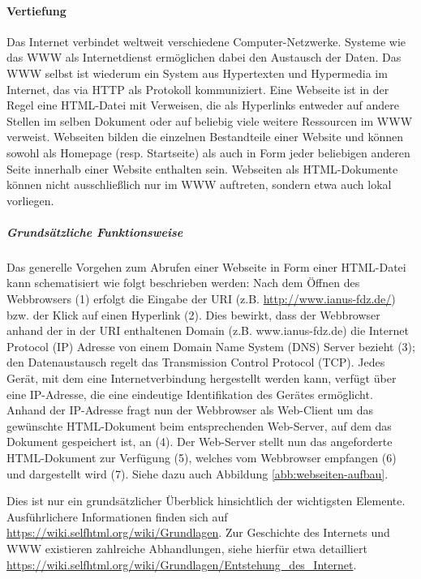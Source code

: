 \paragraph{Vertiefung} 
Das Internet verbindet weltweit verschiedene Computer-Netzwerke. Systeme wie das WWW als Internetdienst ermöglichen dabei den Austausch der Daten. Das WWW selbst ist wiederum ein System aus Hypertexten und Hypermedia im Internet, das via HTTP als Protokoll kommuniziert. Eine Webseite ist in der Regel eine HTML-Datei mit Verweisen, die als Hyperlinks entweder auf andere Stellen im selben Dokument oder auf beliebig viele weitere Ressourcen im WWW verweist. Webseiten bilden die einzelnen Bestandteile einer Website und können sowohl als Homepage (resp. Startseite) als auch in Form jeder beliebigen anderen Seite innerhalb einer Website enthalten sein. Webseiten als HTML-Dokumente können nicht ausschließlich nur im WWW auftreten, sondern etwa auch lokal vorliegen.

\subparagraph{Grundsätzliche Funktionsweise} Das generelle Vorgehen zum Abrufen einer Webseite in Form einer HTML-Datei kann schematisiert wie folgt beschrieben werden: Nach dem Öffnen des Webbrowsers (1) erfolgt die Eingabe der URI (z.B. \url{http://www.ianus-fdz.de/}) bzw. der Klick auf einen Hyperlink (2). Dies bewirkt, dass der Webbrowser anhand der in der URI enthaltenen Domain (z.B. www.ianus-fdz.de) die Internet Protocol (IP) Adresse von einem Domain Name System (DNS) Server bezieht (3); den Datenaustausch regelt das Transmission Control Protocol (TCP). Jedes Gerät, mit dem eine Internetverbindung hergestellt werden kann, verfügt über eine IP-Adresse, die eine eindeutige Identifikation des Gerätes ermöglicht. Anhand der IP-Adresse fragt nun der Webbrowser als Web-Client um das gewünschte HTML-Dokument beim entsprechenden Web-Server, auf dem das Dokument gespeichert ist, an (4). Der Web-Server stellt nun das angeforderte HTML-Dokument zur Verfügung (5), welches vom Webbrowser empfangen (6) und dargestellt wird (7). Siehe dazu auch Abbildung \ref{abb:webseiten-aufbau}.

Dies ist nur ein grundsätzlicher Überblick hinsichtlich der wichtigsten Elemente. Ausführlichere Informationen finden sich auf \url{https://wiki.selfhtml.org/wiki/Grundlagen}. Zur Geschichte des Internets und WWW existieren zahlreiche Abhandlungen, siehe hierfür etwa detailliert \url{https://wiki.selfhtml.org/wiki/Grundlagen/Entstehung_des_Internet}.

